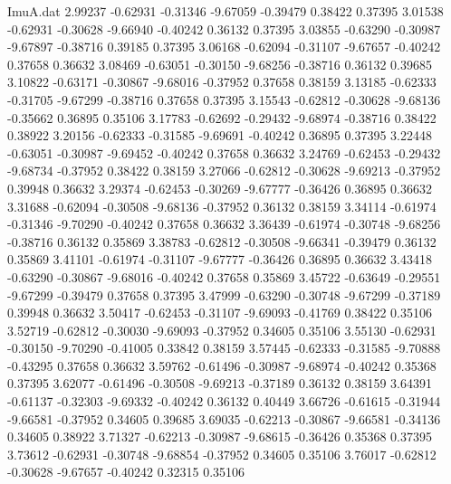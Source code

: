 \begin{filecontents}{ImuA.dat}
   2.99237   -0.62931   -0.31346   -9.67059   -0.39479    0.38422    0.37395
   3.01538   -0.62931   -0.30628   -9.66940   -0.40242    0.36132    0.37395
   3.03855   -0.63290   -0.30987   -9.67897   -0.38716    0.39185    0.37395
   3.06168   -0.62094   -0.31107   -9.67657   -0.40242    0.37658    0.36632
   3.08469   -0.63051   -0.30150   -9.68256   -0.38716    0.36132    0.39685
   3.10822   -0.63171   -0.30867   -9.68016   -0.37952    0.37658    0.38159
   3.13185   -0.62333   -0.31705   -9.67299   -0.38716    0.37658    0.37395
   3.15543   -0.62812   -0.30628   -9.68136   -0.35662    0.36895    0.35106
   3.17783   -0.62692   -0.29432   -9.68974   -0.38716    0.38422    0.38922
   3.20156   -0.62333   -0.31585   -9.69691   -0.40242    0.36895    0.37395
   3.22448   -0.63051   -0.30987   -9.69452   -0.40242    0.37658    0.36632
   3.24769   -0.62453   -0.29432   -9.68734   -0.37952    0.38422    0.38159
   3.27066   -0.62812   -0.30628   -9.69213   -0.37952    0.39948    0.36632
   3.29374   -0.62453   -0.30269   -9.67777   -0.36426    0.36895    0.36632
   3.31688   -0.62094   -0.30508   -9.68136   -0.37952    0.36132    0.38159
   3.34114   -0.61974   -0.31346   -9.70290   -0.40242    0.37658    0.36632
   3.36439   -0.61974   -0.30748   -9.68256   -0.38716    0.36132    0.35869
   3.38783   -0.62812   -0.30508   -9.66341   -0.39479    0.36132    0.35869
   3.41101   -0.61974   -0.31107   -9.67777   -0.36426    0.36895    0.36632
   3.43418   -0.63290   -0.30867   -9.68016   -0.40242    0.37658    0.35869
   3.45722   -0.63649   -0.29551   -9.67299   -0.39479    0.37658    0.37395
   3.47999   -0.63290   -0.30748   -9.67299   -0.37189    0.39948    0.36632
   3.50417   -0.62453   -0.31107   -9.69093   -0.41769    0.38422    0.35106
   3.52719   -0.62812   -0.30030   -9.69093   -0.37952    0.34605    0.35106
   3.55130   -0.62931   -0.30150   -9.70290   -0.41005    0.33842    0.38159
   3.57445   -0.62333   -0.31585   -9.70888   -0.43295    0.37658    0.36632
   3.59762   -0.61496   -0.30987   -9.68974   -0.40242    0.35368    0.37395
   3.62077   -0.61496   -0.30508   -9.69213   -0.37189    0.36132    0.38159
   3.64391   -0.61137   -0.32303   -9.69332   -0.40242    0.36132    0.40449
   3.66726   -0.61615   -0.31944   -9.66581   -0.37952    0.34605    0.39685
   3.69035   -0.62213   -0.30867   -9.66581   -0.34136    0.34605    0.38922
   3.71327   -0.62213   -0.30987   -9.68615   -0.36426    0.35368    0.37395
   3.73612   -0.62931   -0.30748   -9.68854   -0.37952    0.34605    0.35106
   3.76017   -0.62812   -0.30628   -9.67657   -0.40242    0.32315    0.35106

\end{filecontents}
